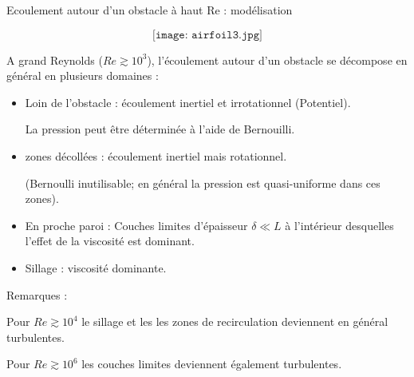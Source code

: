 \begin{frame}{Ecoulement autour d'un obstacle à haut Re : modélisation} 
\small

$$
\texttt{[image: airfoil3.jpg]}
$$

A grand Reynolds ($Re \gtrsim 10^3$), 
l'écoulement autour d'un obstacle se décompose en général en plusieurs domaines :

\begin{itemize}

\item Loin de l'obstacle : écoulement inertiel et irrotationnel (Potentiel).

La pression peut être déterminée à l'aide de Bernouilli.
\pause 

\item zones décollées : écoulement inertiel mais rotationnel.

(Bernoulli inutilisable; en général la pression est quasi-uniforme dans ces zones). 

\pause 
\item En proche paroi : Couches limites d'épaisseur $\delta \ll L$ à l'intérieur desquelles l'effet de la viscosité est dominant.
\pause 

\item Sillage : viscosité dominante.

\end{itemize}

Remarques : 

Pour $Re \gtrsim 10^4 $ le sillage et les les zones de recirculation deviennent en général turbulentes.

Pour $Re \gtrsim 10^6 $ les couches limites deviennent également turbulentes.

\end{frame}


